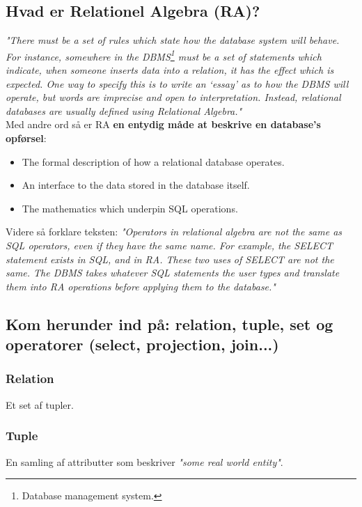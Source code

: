 \newpage

\subsection{Hvad er Relationel Algebra (RA)?}

\textit{"There must be a set of rules which state how the database system will behave. For instance, somewhere in the DBMS\footnote{Database management system.} must be a set of statements which indicate, when someone inserts data into a relation, it has the effect which is expected. One way to specify this is to write an `essay' as to how the DBMS will operate, but words are imprecise and open to interpretation. Instead, relational databases are usually defined using Relational Algebra."}\\

Med andre ord så er RA \textbf{en entydig måde at beskrive en database's opførsel}: 

\begin{itemize}
	\item The formal description of how a relational database operates.
	\item An interface to the data stored in the database itself.
	\item The mathematics which underpin SQL operations.
\end{itemize}

Videre så forklare teksten: \textit{"Operators in relational algebra are not the same as SQL operators, even if they have the same name. For example, the SELECT statement exists in SQL, and in RA. These two uses of SELECT are not the same. The DBMS takes whatever SQL statements the user types and translate them into RA operations before applying them to the database."}

\subsection{Kom herunder ind på: relation, tuple, set og operatorer (select, projection, join...)}

\subsubsection{Relation}
Et set af tupler.

\subsubsection{Tuple}
En samling af attributter som beskriver \textit{"some real world entity"}.


